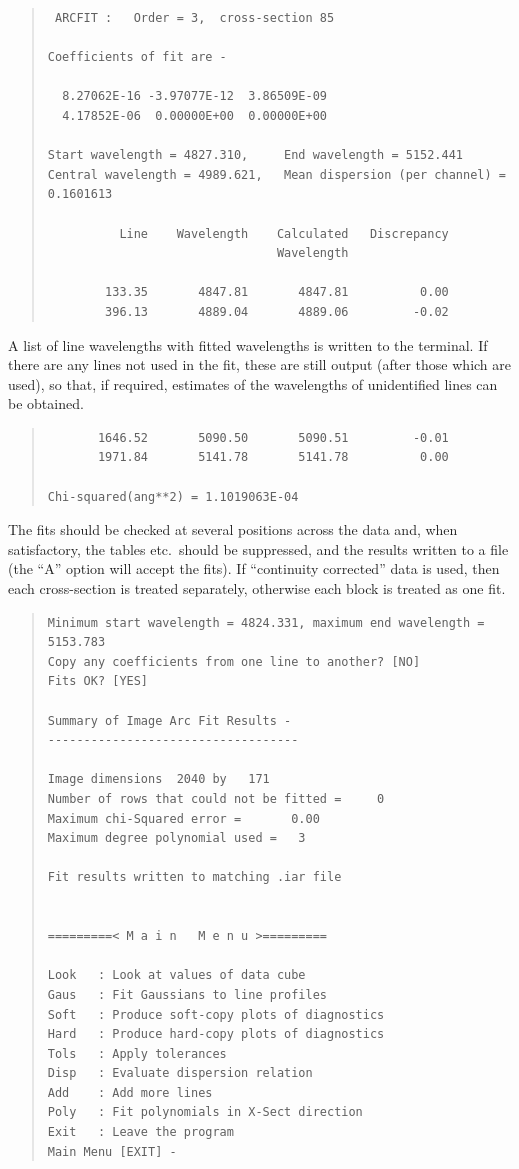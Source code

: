 \documentclass[11pt,twoside]{article}
\begin{document}
\begin{quote}\begin{verbatim}
 ARCFIT :   Order = 3,  cross-section 85

Coefficients of fit are -

  8.27062E-16 -3.97077E-12  3.86509E-09
  4.17852E-06  0.00000E+00  0.00000E+00

Start wavelength = 4827.310,     End wavelength = 5152.441
Central wavelength = 4989.621,   Mean dispersion (per channel) = 0.1601613

          Line    Wavelength    Calculated   Discrepancy
                                Wavelength

        133.35       4847.81       4847.81          0.00
        396.13       4889.04       4889.06         -0.02
\end{verbatim}\end{quote}

A list of line wavelengths with fitted wavelengths is written to
the terminal. If there are any lines not used in the fit, these are
still output (after those which are used), so that, if required,
estimates of the wavelengths of unidentified lines can be obtained.

\begin{quote}\begin{verbatim}
       1646.52       5090.50       5090.51         -0.01
       1971.84       5141.78       5141.78          0.00

Chi-squared(ang**2) = 1.1019063E-04
\end{verbatim}\end{quote}

The fits should be checked at several positions across the data and,
when satisfactory, the tables etc.\ should be suppressed, and the
results written to a file (the ``A'' option will accept the fits).
If ``continuity corrected'' data is used, then each cross-section is
treated separately, otherwise each block is treated as one fit.

\begin{quote}\begin{verbatim}
Minimum start wavelength = 4824.331, maximum end wavelength = 5153.783
Copy any coefficients from one line to another? [NO]
Fits OK? [YES]

Summary of Image Arc Fit Results -
-----------------------------------

Image dimensions  2040 by   171
Number of rows that could not be fitted =     0
Maximum chi-Squared error =       0.00
Maximum degree polynomial used =   3

Fit results written to matching .iar file


=========< M a i n   M e n u >=========

Look   : Look at values of data cube
Gaus   : Fit Gaussians to line profiles
Soft   : Produce soft-copy plots of diagnostics
Hard   : Produce hard-copy plots of diagnostics
Tols   : Apply tolerances
Disp   : Evaluate dispersion relation
Add    : Add more lines
Poly   : Fit polynomials in X-Sect direction
Exit   : Leave the program
Main Menu [EXIT] -
\end{verbatim}\end{quote}
\end{document}
